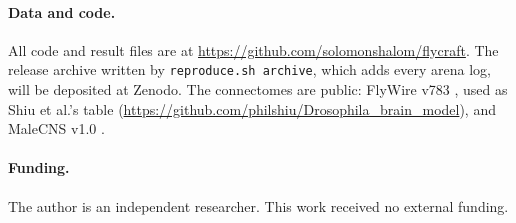 

\paragraph{Data and code.} All code and result files are at \url{https://github.com/solomonshalom/flycraft}. The release archive written by \texttt{reproduce.sh archive}, which adds every arena log, will be deposited at Zenodo. The connectomes are public: FlyWire v783 \citep{dorkenwald2024neuronal,schlegel2024whole}, used as Shiu et al.'s table (\url{https://github.com/philshiu/Drosophila_brain_model}), and MaleCNS v1.0 \citep{berg2026sexual}.

\paragraph{Funding.} The author is an independent researcher. This work received no external funding.

\normalsize
